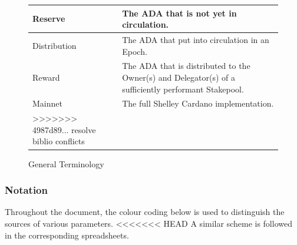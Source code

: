 \documentclass[11pt,a4paper,dvipsnames,twosided,final]{article}
\newcommand{\ada}{ADA{}}
\newcommand{\cardano}[1]{Cardano}
\begin{document}
\begin{figure}[t]
\begin{center}
\begin{tabular}{||l|p{12cm}||}
  Reserve & The \ada{} that is not yet in circulation.\\\hline
  Distribution & The \ada{} that put into circulation in an Epoch.\\\hline
  Reward & The \ada{} that is distributed to the Owner(s) and Delegator(s) of a sufficiently performant Stakepool.\\\hline
  Mainnet & The full Shelley \cardano{} implementation.\\\hline
>>>>>>> 4987d89... resolve biblio conflicts
  \hline
\end{tabular}
\end{center}
\caption{General Terminology}
\label{fig:terminology}
\end{figure}

\newpage
\subsubsection*{Notation}

Throughout the document, the colour coding below is used to distinguish the sources of various parameters.
<<<<<<< HEAD
A similar scheme is followed in the corresponding spreadsheets.
\end{document}
